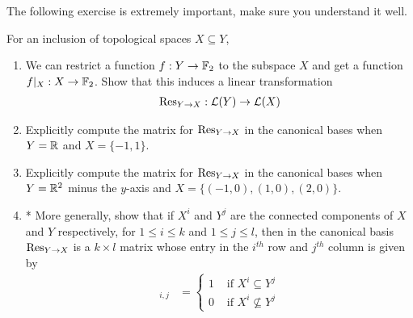 The following exercise is extremely important, make sure you understand it well.
\begin{ques} \label{q:restrictions}
  For an inclusion of topological spaces $X \subseteq Y$,
	\begin{enumerate}
		\item We can restrict a function $f: Y \rightarrow \mathbb{F}_2$ to the subspace $X$ and get a function $f|_{X} : X \rightarrow \mathbb{F}_2$. Show that this induces a linear transformation
    \begin{align*}
			\operatorname{Res}_{Y \rightarrow X}: \mathcal{L}(Y) \rightarrow \mathcal{L}(X)
		\end{align*}
    \item Explicitly compute the matrix for $\operatorname{Res}_{Y \rightarrow X}$ in the canonical bases when $Y = \mathbb{R}$ and $X = \{ -1, 1\}$.
    \item Explicitly compute the matrix for $\operatorname{Res}_{Y \rightarrow X}$ in the canonical bases when $Y = \mathbb{R}^2 $ minus the $y$-axis and $X = \{ (-1,0), (1,0), (2,0)\}$.
    \item* More generally, show that if $X^i$ and $Y^j$ are the connected components of $X$ and $Y$ respectively, for $1 \le i \le k$ and $1 \le j \le l$, then in the canonical basis $\operatorname{Res}_{Y \rightarrow X}$ is a $k \times l$ matrix whose entry in the $i^{th}$ row and $j^{th}$ column is given by
    \begin{align*}
      [\res_{Y \rightarrow X}]_{i,j} &= \begin{cases}
        1 & \mbox{ if } X^i \subseteq Y^j \\
        0 & \mbox{ if } X^i \not \subseteq Y^j
    \end{cases}
    \end{align*}
    \end{enumerate}
\end{ques}







\newpage

